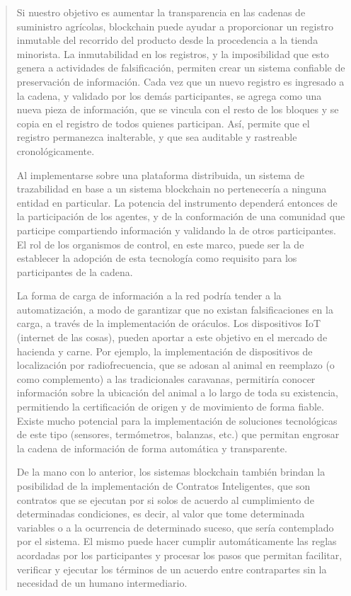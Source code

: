 \documentclass[12pt,a4paper,twoside]{book}
\begin{document}
\begin{quotation}
Si nuestro objetivo es aumentar la transparencia en las cadenas de suministro agrícolas, blockchain puede ayudar a proporcionar un registro inmutable del recorrido del producto desde la procedencia a la tienda minorista. La inmutabilidad en los registros, y la imposibilidad que esto genera a actividades de falsificación, permiten crear un sistema confiable de preservación de información. Cada vez que un nuevo registro es ingresado a la cadena, y validado por los demás participantes, se agrega como una nueva pieza de información, que se vincula con el resto de los bloques y se copia en el registro de todos quienes participan. Así, permite que el registro permanezca inalterable, y que sea auditable y rastreable cronológicamente.

Al implementarse sobre una plataforma distribuida, un sistema de trazabilidad en base a un sistema blockchain no pertenecería a ninguna entidad en particular. La potencia del instrumento dependerá entonces de la participación de los agentes, y de la conformación de una comunidad que participe compartiendo información y validando la de otros participantes. El rol de los organismos de control, en este marco, puede ser la de establecer la adopción de esta tecnología como requisito para los participantes de la cadena.

La forma de carga de información a la red podría tender a la automatización, a modo de garantizar que no existan falsificaciones en la carga, a través de la implementación de oráculos. Los dispositivos IoT (internet de las cosas), pueden aportar a este objetivo en el mercado de hacienda y carne. Por ejemplo, la implementación de dispositivos de localización por radiofrecuencia, que se adosan al animal en reemplazo (o como complemento) a las tradicionales caravanas, permitiría conocer información sobre la ubicación del animal a lo largo de toda su existencia, permitiendo la certificación de origen y de movimiento de forma fiable. Existe mucho potencial para la implementación de soluciones tecnológicas de este tipo (sensores, termómetros, balanzas, etc.) que permitan engrosar la cadena de información de forma automática y transparente.

De la mano con lo anterior, los sistemas blockchain también brindan la posibilidad de la implementación de Contratos Inteligentes, que son contratos que se ejecutan por si solos de acuerdo al cumplimiento de determinadas condiciones, es decir, al valor que tome determinada variables o a la ocurrencia de determinado suceso, que sería contemplado por el sistema. El mismo puede hacer cumplir automáticamente las reglas acordadas por los participantes y procesar los pasos que permitan facilitar, verificar y ejecutar los términos de un acuerdo entre contrapartes sin la necesidad de un humano intermediario. \cite[págs. 18-19]{bolsacomercio}
\end{quotation}
\end{document}
